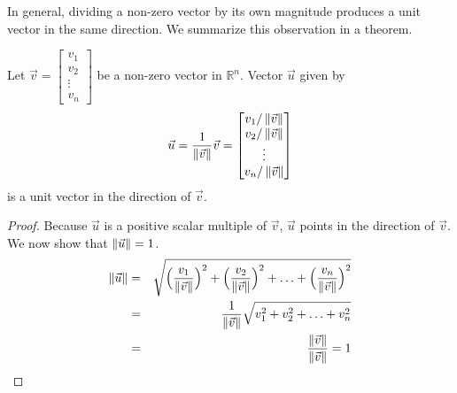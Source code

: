 \documentclass{ximera}
\begin{document}
 
\begin{center}
\end{center}
 
In general, dividing a non-zero vector by its own magnitude produces a unit vector in the same direction.  We summarize this observation in a theorem.


 
 
  \begin{theorem}\label{th:unit} Let $\vec{v}=\begin{bmatrix}v_1\\v_2\\\vdots\\v_n\end{bmatrix}$ be a non-zero vector in $\mathbb{R}^n$. Vector $\vec{u}$ given by
  \begin{equation*}
 \vec{u}=\frac{1}{\left\|\vec{v}\right\|}\vec{v}=\begin{bmatrix}v_1/\left\|\vec{v}\right\|\\v_2/\left\|\vec{v}\right\|\\\vdots\\v_n/\left\|\vec{v}\right\|\end{bmatrix}
\end{equation*}
is a unit vector in the direction of $\vec{v}$.
\end{theorem}



 
\begin{proof}
Because $\vec{u}$ is a positive scalar multiple of $\vec{v}$, $\vec{u}$ points in the direction of $\vec{v}$.  We now show that $\left\|\vec{u}\right\|=1$.
\begin{eqnarray*}
\left\|\vec{u}\right\|&=&\sqrt{ \Big(\frac{v_1}{\left\|\vec{v}\right\|}\Big)^2+\Big(\frac{v_2}{\left\|\vec{v}\right\|}\Big)^2+\ldots +\Big(\frac{v_n}{\left\|\vec{v}\right\|}\Big)^2}\\
&=&\frac{1}{\left\|\vec{v}\right\|}\sqrt{v_1^2+v_2^2+\ldots +v_n^2}\\
&=&\frac{\left\|\vec{v}\right\|}{\left\|\vec{v}\right\|}=1
\end{eqnarray*}
\end{proof}
 
\end{document}
